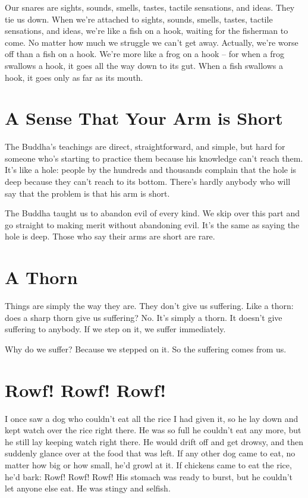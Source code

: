 Our snares are sights, sounds, smells, tastes, tactile sensations, and ideas. They tie us down. When we're attached to sights, sounds, smells, tastes, tactile sensations, and ideas, we're like a fish on a hook, waiting for the fisherman to come. No matter how much we struggle we can't get away. Actually, we're worse off than a fish on a hook. We're more like a frog on a hook -- for when a frog swallows a hook, it goes all the way down to its gut. When a fish swallows a hook, it goes only as far as its mouth.

\clearpage

\section{A Sense That Your Arm is Short}

The Buddha's teachings are direct, straightforward, and simple, but hard for someone who's starting to practice them because his knowledge can't reach them. It's like a hole: people by the hundreds and thousands complain that the hole is deep because they can't reach to its bottom. There's hardly anybody who will say that the problem is that his arm is short.

The Buddha taught us to abandon evil of every kind. We skip over this part and go straight to making merit without abandoning evil. It's the same as saying the hole is deep. Those who say their arms are short are rare.

\section{A Thorn}

Things are simply the way they are. They don't give us suffering. Like a thorn: does a sharp thorn give us suffering? No. It's simply a thorn. It doesn't give suffering to anybody. If we step on it, we suffer immediately. 

Why do we suffer? Because we stepped on it. So the suffering comes from us.

\clearpage

\section{Rowf! Rowf! Rowf!}

I once saw a dog who couldn't eat all the rice I had given it, so he lay down and kept watch over the rice right there. He was so full he couldn't eat any more, but he still lay keeping watch right there. He would drift off and get drowsy, and then suddenly glance over at the food that was left. If any other dog came to eat, no matter how big or how small, he'd growl at it. If chickens came to eat the rice, he'd bark: Rowf! Rowf! Rowf! His stomach was ready to burst, but he couldn't let anyone else eat. He was stingy and selfish.

